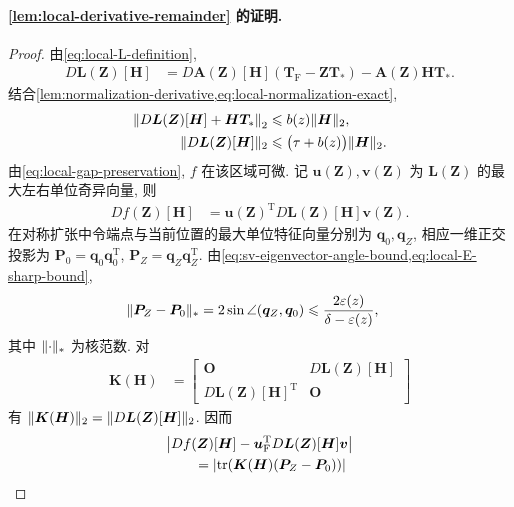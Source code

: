 \documentclass{ctexart}
\newcommand{\T}{\mathrm{T}}
\newcommand{\dt}{\delta}
\renewcommand{\le}{\leqslant}
\DeclareMathOperator{\tr}{tr}
\DeclarePairedDelimiter\norm{\lVert}{\rVert}
\DeclarePairedDelimiter\abs{\lvert}{\rvert}
\begin{document}
\paragraph{\cref{lem:local-derivative-remainder} 的证明.}
\begin{proof}
由\cref{eq:local-L-definition},
\begin{align}
    D\bm L(\bm Z)[\bm H]
    &=D\bm A(\bm Z)[\bm H](\bm T_{\mathrm F}-\bm Z\bm T_\ast)
      -\bm A(\bm Z)\bm H\bm T_\ast.
    \label{eq:local-L-derivative}
\end{align}
结合\cref{lem:normalization-derivative,eq:local-normalization-exact},
\begin{align}
    \norm*{D\bm L(\bm Z)[\bm H]+\bm H\bm T_\ast}_2
    &\le b(z)\norm{\bm H}_2,
    \label{eq:local-L-derivative-endpoint-difference}\\
    \norm{D\bm L(\bm Z)[\bm H]}_2
    &\le\bigl(\tau+b(z)\bigr)\norm{\bm H}_2.
    \label{eq:local-L-derivative-bound}
\end{align}
由\cref{eq:local-gap-preservation}, $f$ 在该区域可微. 记 $\bm u(\bm Z),\bm v(\bm Z)$ 为 $\bm L(\bm Z)$ 的最大左右单位奇异向量, 则
\begin{align}
    Df(\bm Z)[\bm H]
    &=\bm u(\bm Z)^\T D\bm L(\bm Z)[\bm H]\bm v(\bm Z).
    \label{eq:local-f-derivative}
\end{align}
在对称扩张中令端点与当前位置的最大单位特征向量分别为 $\bm q_0,\bm q_Z$, 相应一维正交投影为
$\bm P_0=\bm q_0\bm q_0^\T$, $\bm P_Z=\bm q_Z\bm q_Z^\T$.
由\cref{eq:sv-eigenvector-angle-bound,eq:local-E-sharp-bound},
\begin{align}
    \norm{\bm P_Z-\bm P_0}_\ast
    &=2\sin\angle(\bm q_Z,\bm q_0)
     \le\frac{2\varepsilon(z)}{\dt-\varepsilon(z)},
    \label{eq:local-projector-angle-bound}
\end{align}
其中 $\norm{\cdot}_\ast$ 为核范数. 对
\begin{align}
    \bm K(\bm H)&=
    \begin{bmatrix}
      \mathbf O&D\bm L(\bm Z)[\bm H]\\
      D\bm L(\bm Z)[\bm H]^\T&\mathbf O
    \end{bmatrix}
    \label{eq:local-derivative-dilation}
\end{align}
有 $\norm{\bm K(\bm H)}_2=\norm{D\bm L(\bm Z)[\bm H]}_2$. 因而
\begin{align}
    &\abs*{
      Df(\bm Z)[\bm H]
      -\bm u_{\mathrm F}^\T D\bm L(\bm Z)[\bm H]\bm v}
      \notag\\
    &\qquad=\abs{\tr(\bm K(\bm H)(\bm P_Z-\bm P_0))}

\end{align}
\end{proof}
\end{document}
